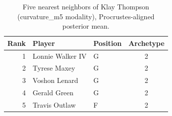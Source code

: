 \begin{table}[htbp]
  \centering\small
  \begin{tabular}{rllc}
    \toprule
    Rank & Player & Position & Archetype \\
    \midrule
    1 & Lonnie Walker IV & G & 2 \\
    2 & Tyrese Maxey & G & 2 \\
    3 & Voshon Lenard & G & 2 \\
    4 & Gerald Green & G & 2 \\
    5 & Travis Outlaw & F & 2 \\
    \bottomrule
  \end{tabular}
  \caption{Five nearest neighbors of Klay Thompson (curvature_m5 modality), Procrustes-aligned posterior mean.}
  \label{tab:Klay_Thompson_neighbors_curvature_m5}
\end{table}

